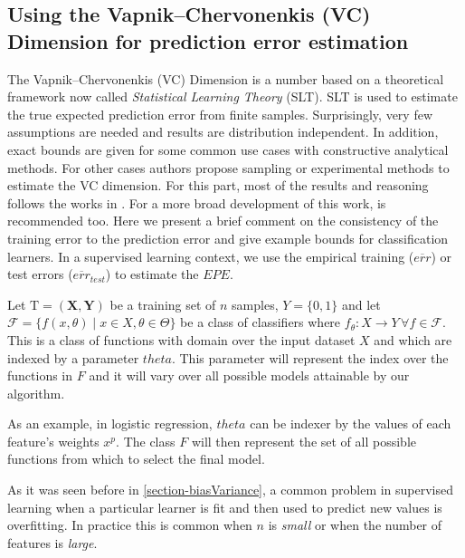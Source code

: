 \subsection{ Using the Vapnik–Chervonenkis (VC) Dimension for prediction error estimation} \label{section-VcDimension}


The Vapnik–Chervonenkis (VC) Dimension is a number based on a theoretical framework now called \textit{Statistical Learning Theory} (SLT). SLT is used to estimate the true expected prediction error from finite samples. Surprisingly, very few assumptions are needed and results are distribution independent. In addition, exact bounds are given for some common use cases with constructive analytical methods. For other cases authors propose sampling or experimental methods to estimate the VC dimension. For this part, most of the results and reasoning follows the works in \cite{cherkassky-learning2007}. For a more broad development of this work, \cite{vapnik-nature2013} is recommended too. Here we present a brief comment on the consistency of the training error to the prediction error and give example bounds for classification learners. In a supervised learning context, we use the empirical training ($\overline{err}$) or test errors ($\overline{err}_{test}$) to estimate the $EPE$. 

Let $\mathrm{T} = (\textbf{X},\textbf{Y})$ be a training set of $n$ samples, $Y = \{0,1 \}$ and let $\mathcal {F} = \{f(x,\theta) \mid x \in X, \theta \in \Theta\}$ be a class of classifiers where $f_\theta: X \rightarrow Y \, \forall f \in \mathcal {F}$. This is a class of functions with domain over the input dataset $X$ and which are indexed by a parameter $theta$. This parameter will represent the index over the functions in $F$ and it will vary over all possible models attainable by our algorithm.

As an example, in logistic regression, $theta$ can be indexer by the values of each feature's weights $x^p$. The class $F$ will then represent the set of all possible functions from which to select the final model.

As it was seen before in \ref{section-biasVariance}, a common problem in supervised learning when a particular learner is fit and then used to predict new values is overfitting. In practice this is common when $n$ is \textit{small} or when the number of features is \textit{large}. 

